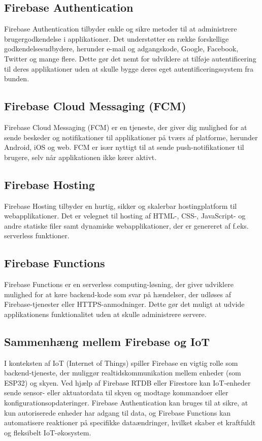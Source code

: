 \subsection*{Firebase Authentication}
Firebase Authentication tilbyder enkle og sikre metoder til at administrere brugergodkendelse i applikationer. Det understøtter en række forskellige godkendelsesudbydere, herunder e-mail og adgangskode, Google, Facebook, Twitter og mange flere. Dette gør det nemt for udviklere at tilføje autentificering til deres applikationer uden at skulle bygge deres eget autentificeringssystem fra bunden.

\subsection*{Firebase Cloud Messaging (FCM)}
Firebase Cloud Messaging (FCM) er en tjeneste, der giver dig mulighed for at sende beskeder og notifikationer til applikationer på tværs af platforme, herunder Android, iOS og web. FCM er især nyttigt til at sende push-notifikationer til brugere, selv når applikationen ikke kører aktivt.

\subsection*{Firebase Hosting}
Firebase Hosting tilbyder en hurtig, sikker og skalerbar hostingplatform til webapplikationer. Det er velegnet til hosting af HTML-, CSS-, JavaScript- og andre statiske filer samt dynamiske webapplikationer, der er genereret af f.eks. serverless funktioner.

\subsection*{Firebase Functions}
Firebase Functions er en serverless computing-løsning, der giver udviklere mulighed for at køre backend-kode som svar på hændelser, der udløses af Firebase-tjenester eller HTTPS-anmodninger. Dette gør det muligt at udvide applikationens funktionalitet uden at skulle administrere servere.

\subsection*{Sammenhæng mellem Firebase og IoT}
I konteksten af IoT (Internet of Things) spiller Firebase en vigtig rolle som backend-tjeneste, der muliggør realtidskommunikation mellem enheder (som ESP32) og skyen. Ved hjælp af Firebase RTDB eller Firestore kan IoT-enheder sende sensor- eller aktuatordata til skyen og modtage kommandoer eller konfigurationsopdateringer. Firebase Authentication kan bruges til at sikre, at kun autoriserede enheder har adgang til data, og Firebase Functions kan automatisere reaktioner på specifikke dataændringer, hvilket skaber et kraftfuldt og fleksibelt IoT-økosystem.


